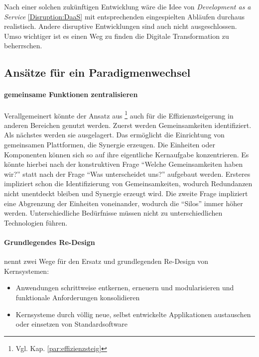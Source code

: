 Nach einer solchen zukünftigen Entwicklung wäre die Idee von \emph{Development as a Service} \ref{Disruption:DaaS} mit entsprechenden eingespielten Abläufen durchaus realistisch. Andere disruptive Entwicklungen sind auch nicht ausgeschlossen. Umso wichtiger ist es einen Weg zu finden die Digitale Transformation zu beherrschen.

%
%
%
%
\subsection{Ansätze für ein Paradigmenwechsel}

\paragraph{gemeinsame Funktionen zentralisieren}
Verallgemeinert könnte der Ansatz aus \cite[S.5]{Gupta:2017}\footnote{Vgl. Kap. \ref{par:effizienzsteig}} auch für die Effizienzsteigerung in anderen Bereichen genutzt werden. Zuerst werden Gemeinsamkeiten identifiziert. Als nächstes werden sie ausgelagert. Das ermöglicht die Einrichtung von gemeinsamen Plattformen, die Synergie erzeugen. Die Einheiten oder Komponenten können sich so auf ihre eigentliche Kernaufgabe konzentrieren. Es könnte hierbei nach der konstruktiven Frage \enquote{Welche Gemeinsamkeiten haben wir?} statt nach der Frage \enquote{Was unterscheidet uns?} aufgebaut werden. Ersteres impliziert schon die Identifizierung von Gemeinsamkeiten, wodurch Redundanzen nicht unentdeckt bleiben und Synergie erzeugt wird. Die zweite Frage impliziert eine Abgrenzung der Einheiten voneinander, wodurch die \enquote{Silos} immer höher werden. Unterschiedliche Bedürfnisse müssen nicht zu unterschiedlichen Technologien führen. 
%
\paragraph{Grundlegendes Re-Design}
\label{ansatz:modularisieren}
\citet{Bussmann2006} nennt zwei Wege für den Ersatz und grundlegenden Re-Design von Kernsystemen:
\begin{itemize}
    \item Anwendungen schrittweise entkernen, erneuern und modularisieren und funktionale Anforderungen konsolidieren
    \item Kernsysteme durch völlig neue, selbst entwickelte Applikationen austauschen oder einsetzen von Standardsoftware
\end{itemize}
%
